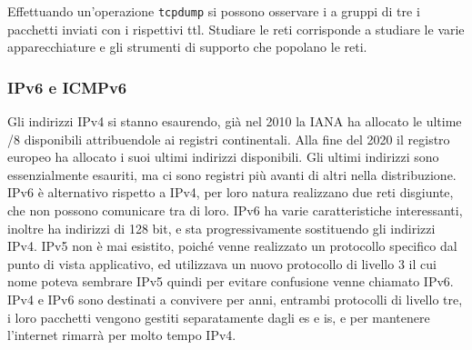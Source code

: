 \documentclass{article}
\numberwithin{equation}{subsection}
\begin{document}
Effettuando un'operazione \verb|tcpdump| si possono osservare i a gruppi di tre i pacchetti inviati con i rispettivi ttl. 
Studiare le reti corrisponde a studiare le varie apparecchiature e gli strumenti di supporto che popolano le reti. 


\subsubsection{IPv6 e ICMPv6}

Gli indirizzi IPv4 si stanno esaurendo, già nel 2010 la IANA ha allocato le ultime /8 disponibili attribuendole ai registri continentali. Alla fine del 2020 il registro 
europeo ha allocato i suoi ultimi indirizzi disponibili. Gli ultimi indirizzi sono essenzialmente esauriti, ma ci sono registri più avanti di altri nella 
distribuzione. IPv6 è alternativo rispetto a IPv4, per loro natura realizzano due reti disgiunte, che non possono comunicare tra di loro. IPv6 ha varie 
caratteristiche interessanti, inoltre ha indirizzi di 128 bit, e sta progressivamente sostituendo gli indirizzi IPv4. 
IPv5 non è mai esistito, poiché venne realizzato un protocollo specifico dal punto di vista applicativo, ed utilizzava un nuovo protocollo di livello 3 il cui nome 
poteva sembrare IPv5 quindi per evitare confusione venne chiamato IPv6. 
IPv4 e IPv6 sono destinati a convivere per anni, entrambi protocolli di livello tre, i loro pacchetti vengono gestiti separatamente dagli es e is, e per mantenere 
l'internet rimarrà per molto tempo IPv4. 
\end{document}
